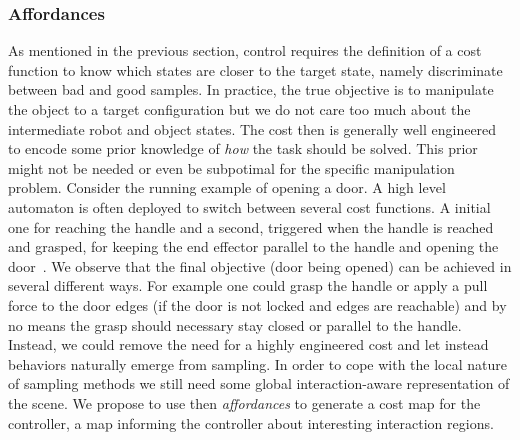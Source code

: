 \subsubsection{Affordances}
As mentioned in the previous section, control requires the definition of a cost function to know which states are closer to the target state, namely discriminate between bad and good samples. In practice, the true objective is to manipulate the object to a target configuration but we do not care too much about the intermediate robot and object states. The cost then is generally well engineered to encode some prior knowledge of \emph{how} the task should be solved. This prior might not be needed or even be subpotimal for the specific manipulation problem. Consider the running example of opening a door. A high level automaton is often deployed to switch between several cost functions. A initial one for reaching the handle and a second, triggered when the handle is reached and grasped, for keeping the end effector parallel to the handle and opening the door~\cite{abraham_model-based_2020}. We observe that the final objective (door being opened) can be achieved in several different ways. For example one could grasp the handle or apply a pull force to the door edges (if the door is not locked and edges are reachable) and by no means the grasp should necessary stay closed or parallel to the handle. Instead, we could remove the need for a highly engineered cost and let instead behaviors naturally emerge from sampling. In order to cope with the local nature of sampling methods we still need some global interaction-aware representation of the scene. We propose to use then \emph{affordances} to generate a cost map for the controller, a map informing the controller about interesting interaction regions.

